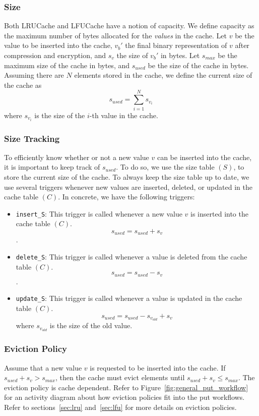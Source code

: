 \subsubsection{Size}
\label{sec:size_description}
Both LRUCache and LFUCache have a notion of capacity. We define capacity
as the maximum number of bytes allocated for the \textit{values} in the cache.
Let $v$ be the value to be inserted into the cache, $v_b'$
the final binary representation of $v$ after compression and encryption,
and $s_v$ the size of $v_b'$ in bytes.
Let $s_{max}$ be the maximum size
of the cache in bytes, and $s_{used}$ be the size of the cache in bytes. Assuming
there are $N$ elements stored in the cache, we define the current size of the cache
as $$ s_{used} = \sum_{i=1}^{N} s_{v_i}$$
where $s_{v_i}$ is the size of the $i$-th value in the cache.

\subsubsection{Size Tracking}
To efficiently know whether or not a new value $v$ can be inserted into the cache,
it is important to keep track of $s_{used}$. To do so, we use the size table $(S)$,
to store the current size of the cache. To always keep the size table up to date,
we use several triggers whenever new values are inserted, deleted, or
updated in the cache table $(C)$. In concrete, we have the following triggers:
\begin{itemize}
    \item \texttt{insert\_S}: This trigger is called whenever a new value $v$
        is inserted into the cache table $(C)$. $$s_{used} = s_{used} + s_v$$.
    \item \texttt{delete\_S}: This trigger is called whenever a value
        is deleted from the cache table $(C)$.
        $$s_{used} = s_{used} - s_v$$.
    \item \texttt{update\_S}: This trigger is called whenever a value
        is updated in the cache table $(C)$.
        $$s_{used} = s_{used} - s_{v_{old}} + s_v$$
        where $s_{v_{old}}$ is the size of the old value.
\end{itemize}

\subsubsection{Eviction Policy}
Assume that a new value $v$ is requested to be inserted into the cache.
If $s_{used} + s_v > s_{max}$, then the cache must evict elements
until $s_{used} + s_v \leq s_{max}$. The eviction policy is cache dependent.
Refer to
Figure~\ref{fig:general_put_workflow} for an activity
diagram about how eviction policies
fit into the put workflows.
Refer to sections~\ref{sec:lru} and~\ref{sec:lfu} for more details
on eviction policies.

